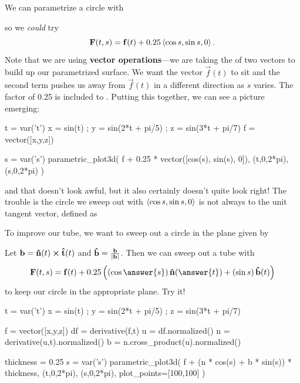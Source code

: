 \documentclass{ximera}
\begin{document}
  We can parametrize a circle with
  \begin{multipleChoice}
  \end{multipleChoice}
  so we \textit{could} try
  \[
    \mathbf{F}(t,s) = \mathbf{f}(t) + 0.25 \left\langle \cos s, \sin s, 0\right\rangle.
  \]
  Note that we are using \textbf{vector operations}---we are taking the
 of two vectors to build up our parametrized surface.  We want the vector $\vec{f}(t)$ to sit  and the second term pushes us away from $\vec{f}(t)$ in a different direction as $s$ varies.  The factor of 0.25 is included to .  Putting this together, we can see a picture emerging:
  \begin{sageCell}
t = var('t')
x = sin(t) ; y = sin(2*t + pi/5) ; z = sin(3*t + pi/7)
f = vector([x,y,z])

s = var('s')
parametric_plot3d( f + 0.25 * vector([cos(s), sin(s), 0]), (t,0,2*pi), (s,0,2*pi) )
\end{sageCell}
and that doesn't look awful, but it also certainly doesn't quite look
right!  The trouble is the circle we sweep out with
$\left\langle \cos s, \sin s, 0\right\rangle$ is not always
 to the
unit tangent vector, defined as
\begin{multipleChoice}
\end{multipleChoice}
To improve our tube, we want to sweep out a circle in the plane given by
\begin{multipleChoice}
\end{multipleChoice}
Let $\mathbf{b} = \mathbf{\hat{n}}(t) \boldsymbol\times \mathbf{\hat{t}}(t)$ and $\mathbf{\hat{b}} = \frac{\mathbf{b}}{| \mathbf{b} |}$.  Then we can sweep out a tube with
  \[
    \vec{F}(t,s) = \vec{f}(t) + 0.25 \left( \left( \cos \answer{s} \right) \unormal(\answer{t}) + \left( \sin s \right) \ubinormal(t) \right)
  \]
  to keep our circle in the appropriate plane.  Try it!
\begin{sageCell}
t = var('t')
x = sin(t) ; y = sin(2*t + pi/5) ; z = sin(3*t + pi/7)

f = vector([x,y,z])
df = derivative(f,t)
u = df.normalized()
n = derivative(u,t).normalized()
b = n.cross_product(u).normalized()

thickness = 0.25
s = var('s')
parametric_plot3d( f + (n * cos(s) + b * sin(s)) * thickness, (t,0,2*pi), (s,0,2*pi), plot_points=[100,100] )
\end{sageCell}
\end{document}
